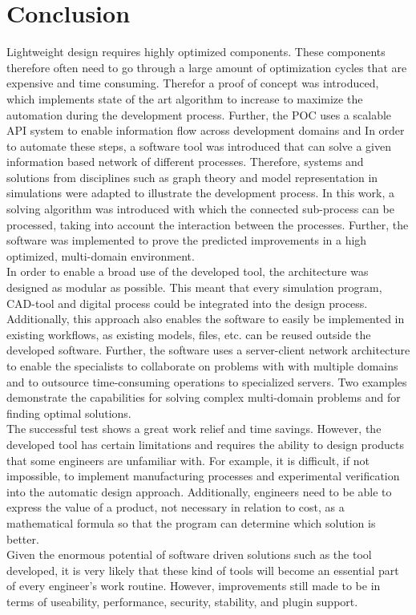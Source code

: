 \section{Conclusion}

Lightweight design requires highly optimized components.
These components therefore often need to go through a large amount of optimization cycles that are expensive and time consuming.
Therefor a proof of concept was introduced, which implements state of the art algorithm to increase to maximize the automation during the development process.
Further, the POC uses a scalable API system to enable information flow across development domains and 
In order to automate these steps, a software tool was introduced that can solve a given information based network of different processes.
Therefore, systems and solutions from disciplines such as graph theory and model representation in simulations were adapted to illustrate the development process.
In this work, a solving algorithm was introduced with which the connected sub-process can be processed, taking into account the interaction between the processes.
Further, the software was implemented to prove the predicted improvements in a high optimized, multi-domain environment.\\
In order to enable a broad use of the developed tool, the architecture was designed as modular as possible.
This meant that every simulation program, CAD-tool and digital process could be integrated into the design process.
Additionally, this approach also enables the software to easily be implemented in existing workflows, as existing models, files, etc. can be reused outside the developed software.
Further, the software uses a server-client network architecture to enable the specialists to collaborate on problems with with multiple domains and to outsource time-consuming operations to specialized servers.
Two examples demonstrate the capabilities for solving complex multi-domain problems and for finding optimal solutions.\\
The successful test shows a great work relief and time savings.
However, the developed tool has certain limitations and requires the ability to design products that some engineers are unfamiliar with.
For example, it is difficult, if not impossible, to implement manufacturing processes and experimental verification into the automatic design approach.
Additionally, engineers need to be able to express the value of a product, not necessary in relation to cost, as a mathematical formula so that the program can determine which solution is better.\\
Given the enormous potential of software driven solutions such as the tool developed, it is very likely that these kind of tools will become an essential part of every engineer's work routine.
However, improvements still made to be in terms of useability, performance, security, stability, and plugin support.\\

